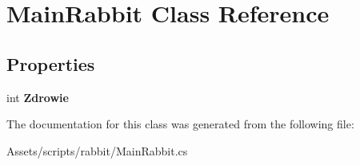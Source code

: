 \hypertarget{class_main_rabbit}{}\section{Main\+Rabbit Class Reference}
\label{class_main_rabbit}
\subsection*{Properties}
\begin{DoxyCompactItemize}
\item 
\mbox{\label{class_main_rabbit_a2e479dd2b9ab6758a9da605d85dcfb4c}} 
int {\bfseries Zdrowie}
\end{DoxyCompactItemize}


The documentation for this class was generated from the following file\+:\begin{DoxyCompactItemize}
\item 
Assets/scripts/rabbit/Main\+Rabbit.\+cs\end{DoxyCompactItemize}
